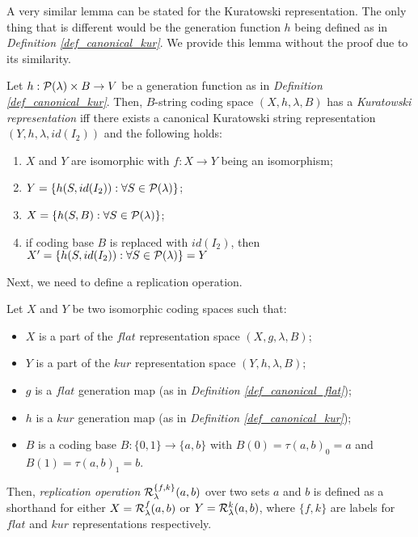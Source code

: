 A very similar lemma can be stated for the Kuratowski representation. The only thing that is different would be the generation function $h$ being defined as in \textit{Definition \ref{def_canonical_kur}}. We provide this lemma without the proof due to its similarity.

\begin{lemma}\label{lemma_kur_representation}
    Let $h: \mathcal{P}(\lambda) \times B \to V$ be a generation function as in \textit{Definition \ref{def_canonical_kur}}.
    Then, $B$-string coding space $(X, h, \lambda, B)$ has a \textit{Kuratowski representation} iff there exists a canonical Kuratowski string representation $(Y, h, \lambda, id(I_2))$ and the following holds: 
    \begin{enumerate}[label=(\roman*)]
        \item $X$ and $Y$ are isomorphic with $f: X \to Y$ being an isomorphism;
        \item $Y = \{ h(S, id(I_2)): \forall S \in \mathcal{P}(\lambda)\}$;
        \item $X = \{ h(S, B): \forall S \in \mathcal{P}(\lambda)\}$;
        \item if coding base $B$ is replaced with $id(I_2)$, then $X^\prime = \{ h(S, id(I_2)): \forall S \in \mathcal{P}(\lambda)\} = Y$
    \end{enumerate}
\end{lemma}

Next, we need to define a replication operation.

\begin{definition}\label{def_rep_op}
    Let $X$ and $Y$ be two isomorphic coding spaces such that:
    \begin{itemize}
        \item $X$ is a part of the $flat$ representation space $(X, g, \lambda, B)$;
        \item $Y$ is a part of the $kur$ representation space $(Y, h, \lambda, B)$;
        \item $g$ is a $flat$ generation map (as in \textit{Definition \ref{def_canonical_flat}});
        \item $h$ is a $kur$ generation map (as in \textit{Definition \ref{def_canonical_kur}});
        \item $B$ is a coding base $B: \{0,1\} \to \{a, b\}$ with \( B(0) = \tau(a, b)_{0} = a \) and \( B(1) = \tau(a, b)_{1} = b \).
    \end{itemize}
    Then, \textit{replication operation} $\mathcal{R}^{\{f,k\}}_\lambda(a,b)$ over two sets $a$ and $b$ is defined as a shorthand for either $X = \mathcal{R}^f_\lambda(a,b)$ or $Y = \mathcal{R}^k_\lambda(a,b)$, where $\{f,k\}$ are labels for $flat$ and $kur$ representations respectively.
\end{definition}

